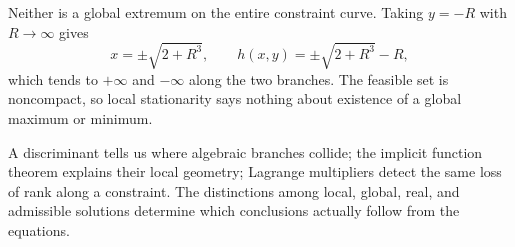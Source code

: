 Neither is a global extremum on the entire constraint curve. Taking \(y=-R\) with \(R\to\infty\) gives
\[
 x=\pm\sqrt{2+R^3},\qquad
 h(x,y)=\pm\sqrt{2+R^3}-R,
\]
which tends to \(+\infty\) and \(-\infty\) along the two branches. The feasible set is noncompact, so local stationarity says nothing about existence of a global maximum or minimum.

A discriminant tells us where algebraic branches collide; the implicit function theorem explains their local geometry; Lagrange multipliers detect the same loss of rank along a constraint. The distinctions among local, global, real, and admissible solutions determine which conclusions actually follow from the equations.
